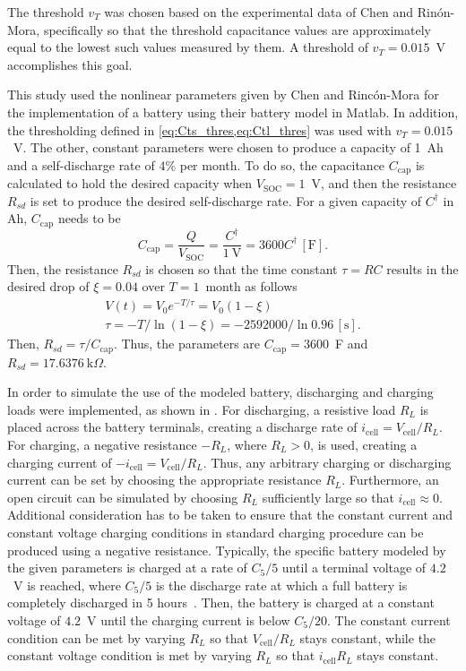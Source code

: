 \documentclass[../zhang_thesis.tex]{subfiles}
\begin{document}
The threshold $v_T$ was chosen based on the experimental data of Chen and Rin\'on-Mora, specifically so that the threshold capacitance values are approximately equal to the lowest such values measured by them. A threshold of $v_T=0.015$~V accomplishes this goal.

This study used the nonlinear parameters given by Chen and Rinc\'on-Mora for the implementation of a battery using their battery model in Matlab. In addition, the thresholding defined in \cref{eq:Cts_thres,eq:Ctl_thres} was used with $v_T=0.015$~V. The other, constant parameters were chosen to produce a capacity of 1~Ah and a self-discharge rate of 4\% per month. To do so, the capacitance $C_\text{cap}$ is calculated to hold the desired capacity
when $V_\text{SOC}=1$~V, and then the resistance $R_{sd}$ is set to produce the desired self-discharge rate. For a given capacity of $C^\dag$ in Ah, $C_\text{cap}$ needs to be
\begin{equation}
    C_\text{cap} = \frac{Q}{V_\text{SOC}} = \frac{C^\dag}{1~\text{V}} = 3600 C^\dag \,[\text{F}].
\end{equation}
Then, the resistance $R_{sd}$ is chosen so that the time constant $\tau=RC$ results in the desired drop of $\xi=0.04$ over $T=1$~month as follows
\begin{gather}
    V(t) = V_0 e^{-T/\tau} = V_0 (1-\xi) \\
    \tau = -T/\ln(1-\xi) = -2592000/\ln 0.96 \,[\text{s}].
\end{gather}
Then, $R_{sd}=\tau/C_\text{cap}$. Thus, the parameters are $C_\text{cap}=3600$~F and $R_{sd}=17.6376~\mathrm{k}\Omega$.

In order to simulate the use of the modeled battery, discharging and charging loads were implemented, as shown in . For discharging, a resistive load $R_L$ is placed across the battery terminals, creating a discharge rate of $i_\text{cell}=V_\text{cell}/R_L$. For charging, a negative resistance $-R_L$, where $R_L>0$, is used, creating a charging current of $-i_\text{cell}=V_\text{cell}/R_L$. Thus, any arbitrary charging or discharging current can be set
by choosing the appropriate resistance $R_L$. Furthermore, an open circuit can be simulated by choosing $R_L$ sufficiently large so that $i_\text{cell}\approx 0$. Additional consideration has to be taken to ensure that the constant current and constant voltage charging conditions in standard charging procedure can be produced using a negative resistance. Typically, the specific battery modeled by the given parameters is charged at a rate of $C_5/5$ until a terminal voltage of $4.2$~V is reached, where $C_5/5$ is the discharge
rate at which a full battery is completely discharged in 5 hours~\cite{linden01_ch3}. Then, the battery is charged at a constant voltage of $4.2$~V until the charging current is below $C_5/20$. The constant current condition can be met by varying $R_L$ so that $V_\text{cell}/R_L$ stays constant, while the constant voltage condition is met by varying $R_L$ so that $i_\text{cell} R_L$ stays constant.
\end{document}
